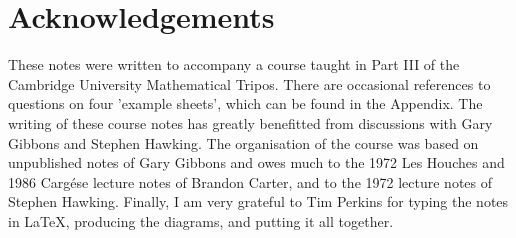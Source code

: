 \section*{Acknowledgements}

These notes were written to accompany a course taught in
Part III of the Cambridge University Mathematical Tripos. 
There are occasional references to questions on four 'example sheets', which can be found in the Appendix.
The writing of these course notes has greatly benefitted from 
discussions with Gary Gibbons and Stephen Hawking. The organisation of the 
course was based on unpublished notes of Gary Gibbons and owes much to the
1972 Les Houches and 1986 Carg{\' e}se lecture notes of Brandon Carter, and to
the 1972 lecture notes of Stephen Hawking. Finally, I am very grateful to 
Tim Perkins for typing the notes in \LaTeX, producing the diagrams, and putting
it all together.

\clearpage
